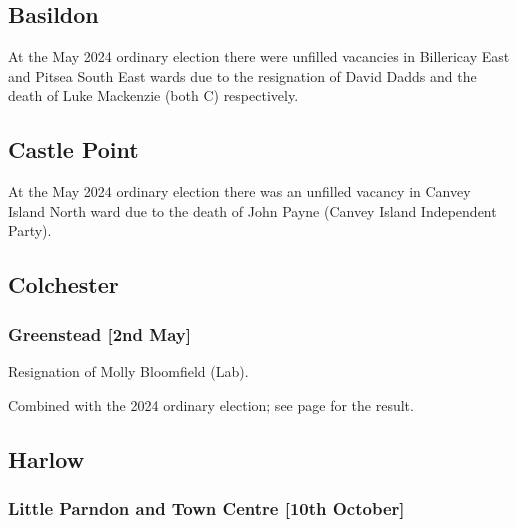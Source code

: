 \documentclass[a4paper,openany]{book}
\begin{document}
\begin{resultsiii}
\subsection*{Basildon}

At the May 2024 ordinary election there were unfilled vacancies in Billericay East and Pitsea South East wards due to the resignation of David Dadds and the death of Luke Mackenzie (both C) respectively.%

\subsection*{Castle Point}

At the May 2024 ordinary election there was an unfilled vacancy in Canvey Island North ward due to the death of John Payne (Canvey Island Independent Party).%

\subsection*{Colchester}

\subsubsection*{Greenstead \hspace*{\fill}\nolinebreak[1]%
	\enspace\hspace*{\fill}
	[2nd May]}


Resignation of Molly Bloomfield (Lab).

Combined with the 2024 ordinary election; see page \pageref{ColchesterGreenstead} for the result.

\subsection*{Harlow}

\subsubsection*{Little Parndon and Town Centre \hspace*{\fill}\nolinebreak[1]%
	\enspace\hspace*{\fill}
	[10th October]}


\end{resultsiii}
\end{document}
